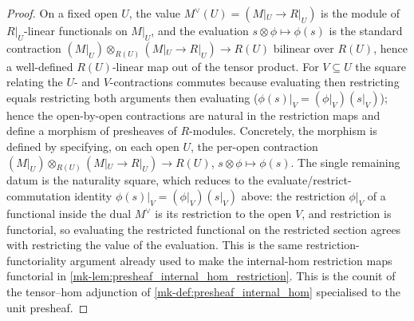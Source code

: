\begin{proof}
  \leanok
  On a fixed open \(U\), the value \(M^\vee(U) = (M|_U \to R|_U)\) is the module of
  \(R|_U\)-linear functionals on \(M|_U\), and the evaluation
  \(s \otimes \phi \mapsto \phi(s)\) is the standard contraction
  \((M|_U) \otimes_{R(U)} (M|_U \to R|_U) \to R(U)\) bilinear over \(R(U)\), hence a
  well-defined \(R(U)\)-linear map out of the tensor product. For \(V \subseteq U\)
  the square relating the \(U\)- and \(V\)-contractions commutes because evaluating
  then restricting equals restricting both arguments then evaluating
  (\(\phi(s)|_V = (\phi|_V)(s|_V)\)); hence the open-by-open contractions are natural
  in the restriction maps and define a morphism of presheaves of \(R\)-modules.
  Concretely, the morphism is defined by specifying, on each open \(U\), the per-open
  contraction \((M|_U) \otimes_{R(U)} (M|_U \to R|_U) \to R(U)\), \(s \otimes \phi \mapsto \phi(s)\).
  The single remaining datum is the naturality square, which reduces to the
  evaluate/restrict-commutation identity \(\phi(s)|_V = (\phi|_V)(s|_V)\) above: the
  restriction \(\phi|_V\) of a functional inside the dual \(M^\vee\) is its restriction
  to the open \(V\), and restriction is functorial, so evaluating the restricted
  functional on the restricted section agrees with restricting the value of the
  evaluation. This is the same restriction-functoriality argument already used to make
  the internal-hom restriction maps functorial in
  \ref{mk-lem:presheaf_internal_hom_restriction}. This is the counit of the tensor--hom
  adjunction of \ref{mk-def:presheaf_internal_hom} specialised to the unit presheaf.
\end{proof}

